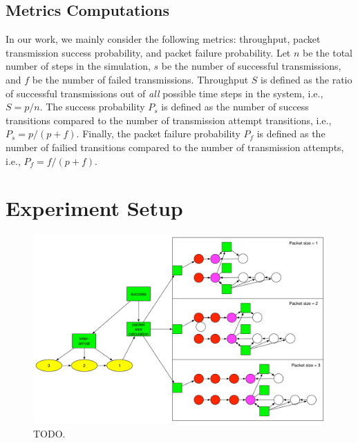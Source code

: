 \documentclass{llncs}
\begin{document}
\subsection{Metrics Computations}
In our work, we mainly consider the following metrics: throughput, packet transmission success probability, and packet failure probability. Let $n$ be the total number of steps in the simulation, $s$ be the number of successful transmissions, and $f$ be the number of failed transmissions. Throughput $S$ is defined as the ratio of successful transmissions out of \emph{all} possible time steps in the system, i.e., $S = p / n$. The success probability $P_s$ is defined as the number of success transitions compared to the number of transmission attempt transitions, i.e., $P_s = p / (p + f)$. Finally, the packet failure probability $P_f$ is defined as the number of failied transitions compared to the number of transmission attempts, i.e., $P_f = f / (p + f)$. 

\section{Experiment Setup}

\begin{figure}
\begin{center}
\includegraphics[scale=0.35]{../../sketches/compressible_dcf_all.pdf}
\caption{TODO.}
\label{fig:compressible_dcf_all}
\end{center}
\end{figure}
\end{document}
